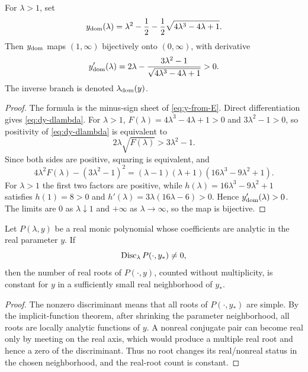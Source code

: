 \begin{proposition}\label{prop:positive-maximal-modulus-branch}
For $\lambda>1$, set
\begin{equation}\label{eq:y-phys}
y_{\rm dom}(\lambda)=\lambda^2-\frac12-\frac12\sqrt{4\lambda^3-4\lambda+1}.
\end{equation}
Then $y_{\rm dom}$ maps $(1,\infty)$ bijectively onto $(0,\infty)$, with derivative
\begin{equation}\label{eq:dy-dlambda}
y_{\rm dom}'(\lambda)=2\lambda-\frac{3\lambda^2-1}{\sqrt{4\lambda^3-4\lambda+1}}>0.
\end{equation}
The inverse branch is denoted $\lambda_{\rm dom}(y)$.
\end{proposition}
\begin{proof}
The formula is the minus-sign sheet of \eqref{eq:y-from-E}.  Direct differentiation gives \eqref{eq:dy-dlambda}.  For $\lambda>1$,
\(F(\lambda)=4\lambda^3-4\lambda+1>0\) and \(3\lambda^2-1>0\), so positivity of \eqref{eq:dy-dlambda} is equivalent to
\[
2\lambda\sqrt{F(\lambda)}>3\lambda^2-1.
\]
Since both sides are positive, squaring is equivalent, and
\[
4\lambda^2F(\lambda)-(3\lambda^2-1)^2
=(\lambda-1)(\lambda+1)(16\lambda^3-9\lambda^2+1).
\]
For $\lambda>1$ the first two factors are positive, while
\(h(\lambda)=16\lambda^3-9\lambda^2+1\) satisfies \(h(1)=8>0\) and
\(h'(\lambda)=3\lambda(16\lambda-6)>0\).  Hence \(y'_{\rm dom}(\lambda)>0\).  The limits are $0$ as $\lambda\downarrow1$ and $+\infty$ as $\lambda\to\infty$, so the map is bijective.
\end{proof}

\begin{lemma}\label{lem:root-count-continuity-nondiscriminant}
Let \(P(\lambda,y)\) be a real monic polynomial whose coefficients are analytic in the real parameter \(y\).  If
\[
\operatorname{Disc}_\lambda P(\cdot,y_*)\ne0,
\]
then the number of real roots of \(P(\cdot,y)\), counted without multiplicity, is constant for \(y\) in a sufficiently small real neighborhood of \(y_*\).
\end{lemma}
\begin{proof}
The nonzero discriminant means that all roots of \(P(\cdot,y_*)\) are simple.  By the implicit-function theorem, after shrinking the parameter neighborhood, all roots are locally analytic functions of \(y\).  A nonreal conjugate pair can become real only by meeting on the real axis, which would produce a multiple real root and hence a zero of the discriminant.  Thus no root changes its real/nonreal status in the chosen neighborhood, and the real-root count is constant.
\end{proof}

